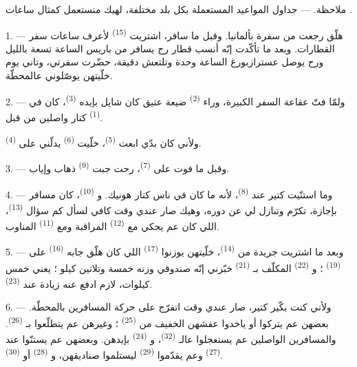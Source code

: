 \VUsaut{4.0mm}
\VUsaut{2.4mm}
\VUsaut{3.4mm}
\textsc{ملاحظة.} --- جداول المواعيد المستعملة بكل بلد مختلفة، لهيك
منستعمل كمثال ساعات .

1. --- هلّق رجعت من سفرة بألمانيا. وقبل ما سافر، اشتريت  \textsuperscript{(15)} لأعرف ساعات سفر القطارات. وبعد ما
تأكّدت إنّه أنسب قطار رح يسافر من باريس الساعة تسعة بالليل ورح يوصل
عسترازبورغ الساعة وحدة وتلتعش دقيقة، حضّرت سفرتي، وتاني يوم خلّيتهن
يوصّلوني عالمحطّة.

2. --- ولمّا فتّ عقاعة السفر الكبيرة، وراء 
\textsuperscript{(2)} ضيعة عتيق كان شايل بإيده 
\textsuperscript{(3)}، كان في  \textsuperscript{(1)} كتار
واصلين من قبل.

ولأني كان بدّي ابعت  \textsuperscript{(5)}،
خلّيت  \textsuperscript{(6)} يدلّني على  \textsuperscript{(4)}.

3. --- وقبل ما فوت على  \textsuperscript{(7)}،
رحت جبت  \textsuperscript{(9)} ذهاب وإياب.

4. --- وما استنّيت كتير عند  \textsuperscript{(8)}، لأنه
ما كان في ناس كتار هونيك. و \textsuperscript{(10)}، كان
مسافر بإجازة، تكرّم وتنازل لي عن دوره، وهيك صار عندي وقت كافي لسأل كم
سؤال  \textsuperscript{(13)}، اللي كان عم يحكي مع
 \textsuperscript{(12)} المراقبة ومع 
\textsuperscript{(11)} المناوب.

\VUsaut{3.0mm}

5. --- وبعد ما اشتريت جريدة من  \textsuperscript{(14)}،
خلّيتهن يوزنوا  \textsuperscript{(17)} اللي كان هلّق جابه
 \textsuperscript{(16)} على 
\textsuperscript{(19)} ؛ و \textsuperscript{(22)} المكلّف
بـ \textsuperscript{(21)} خبّرني إنّه صندوقي وزنه خمسة
وتلاتين كيلو ؛ يعني  خمس كيلوات، لازم ادفع عنه زيادة
عند  \textsuperscript{(23)}.

6. --- ولأني كنت بكّير كتير، صار عندي وقت اتفرّج على حركة المسافرين
بالمحطّة. بعضهن عم يتركوا أو ياخدوا عفشهن الخفيف من  \textsuperscript{(25)} ؛ وغيرهن عم يتطلّعوا بـ \textsuperscript{(26)}. والمسافرين الواصلين عم يستعجلوا
عالـ \textsuperscript{(32)}، و
\textsuperscript{(24)} بإيدهن. وبعضهن عم يستنّوا عند  \textsuperscript{(27)} وعم يقدّموا 
\textsuperscript{(29)} ليستلموا صناديقهن، و
\textsuperscript{(28)} أو  \textsuperscript{(30)}.

